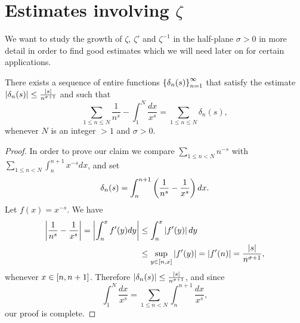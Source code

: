\section{Estimates involving $\zeta$}
We want to study the growth of $\zeta$, $\zeta'$ and $\zeta^{-1}$ in the half-plane $\sigma > 0$ in more detail in order to find good estimates which we will need later on for certain applications.

\begin{proposition}
	There exists a sequence of entire functions $\left\{\delta_n(s)\right\} _{n = 1} ^\infty$ that satisfy the estimate $\left|\delta_n(s)\right| \leq \frac{\left|s\right|}{n^{\sigma + 1}}$ and such that
\begin{equation}\label{equ:SumDelta}
	\sum _{1 \leq n \leq N} \frac{1}{n^s} - \int _1 ^N \frac{dx}{x^s} = \sum _{1 \leq n \leq N} \delta_n(s),
\end{equation}
	whenever $N$ is an integer $> 1$ and $\sigma > 0$.
\end{proposition}
\begin{proof}
	In order to prove our claim we compare $\sum _{1 \leq n < N} n^{-s}$ with $\sum _{1 \leq n < N} \int _n ^{n + 1} x^{-s} dx$, and set
\begin{equation*}
	\delta_n(s) = \int _n ^{n + 1} \left(\frac{1}{n^s} - \frac{1}{x^s}\right) dx.
\end{equation*}
	Let $f(x) = x^{-s}$. We have
\begin{equation*}
\begin{aligned}	
	\left|\frac{1}{n^s} - \frac{1}{x^s}\right| = \left|\int _n ^x f'(y) dy\right| 
	&\leq \int _n ^x \left|f'(y)\right| dy \\
	&\leq \sup _{y \in \left[n, x\right]} \left|f'(y)\right| = \left|f'(n)\right| = \frac{\left|s\right|}{n^{\sigma + 1}},
\end{aligned}
\end{equation*}
	whenever $x \in \left[n, n + 1\right]$. Therefore $\left|\delta_n(s)\right| \leq \frac{\left|s\right|}{n^{\sigma + 1}}$, and since
\begin{equation*}
	\int _1 ^N \frac{dx}{x^s} = \sum _{1 \leq n < N} \int _n ^{n + 1} \frac{dx}{x^s},
\end{equation*}
	our proof is complete.
\end{proof}



